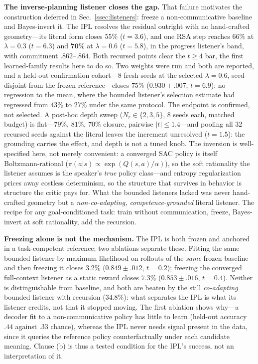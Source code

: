 \documentclass[sigconf,review,anonymous]{acmart}
\begin{document}
\textbf{The inverse-planning listener closes the gap.} That failure motivates the construction deferred in Sec.~\ref{ssec:listeners}: freeze a non-communicative baseline and Bayes-invert it. The IPL resolves the residual outright with no hand-crafted geometry---its literal form closes $55\%$ ($t=3.6$), and one RSA step reaches $66\%$ at $\lambda{=}0.3$ ($t=6.3$) and $\mathbf{70\%}$ at $\lambda{=}0.6$ ($t=5.8$), in the progress listener's band, with commitment $.862$--$.864$. Both recursed points clear the $t\ge4$ bar, the first learned-family results here to do so. Two weights were run and both are reported, and a held-out confirmation cohort---8 fresh seeds at the selected $\lambda{=}0.6$, seed-disjoint from the frozen reference---closes $75\%$ ($0.930\pm.007$, $t{=}6.9$): no regression to the mean, where the bounded listener's selection estimate had regressed from $43\%$ to $27\%$ under the same protocol. The endpoint is confirmed, not selected. A post-hoc depth sweep ($N_r{\in}{\{}2,3,5{\}}$, 8 seeds each, matched budget) is flat---$79\%$, $81\%$, $70\%$ closure, pairwise $|t|{\le}1.4$---and pooling all 32 recursed seeds against the literal leaves the increment unresolved ($t{=}1.5$): the grounding carries the effect, and depth is not a tuned knob. The inversion is well-specified here, not merely convenient: a converged SAC policy is itself Boltzmann-rational ($\pi(a|s)\propto\exp(Q(s,a)/\alpha)$), so the soft rationality the listener assumes is the speaker's \emph{true} policy class---and entropy regularization prices away costless determinism, so the structure that survives in behavior is structure the critic pays for. What the bounded listeners lacked was never hand-crafted geometry but a \emph{non-co-adapting, competence-grounded} literal listener. The recipe for any goal-conditioned task: train without communication, freeze, Bayes-invert at soft rationality, add the recursion.

\textbf{Freezing alone is not the mechanism.} The IPL is both frozen and anchored in a task-competent reference; two ablations separate these. Fitting the same bounded listener by maximum likelihood on rollouts of the \emph{same} frozen baseline and then freezing it closes $3.2\%$ ($0.849\pm.012$, $t{=}0.2$); freezing the converged full-context listener as a static reward closes $7.3\%$ ($0.853\pm.016$, $t{=}0.4$). Neither is distinguishable from baseline, and both are beaten by the still \emph{co-adapting} bounded listener with recursion ($34.8\%$): what separates the IPL is what its listener credits, not that it stopped moving. The first ablation shows why---a decoder fit to a non-communicative policy has little to learn (held-out accuracy $.44$ against $.33$ chance), whereas the IPL never needs signal present in the data, since it queries the reference policy counterfactually under each candidate meaning. Clause (b) is thus a tested condition for the IPL's success, not an interpretation of it.
\end{document}
